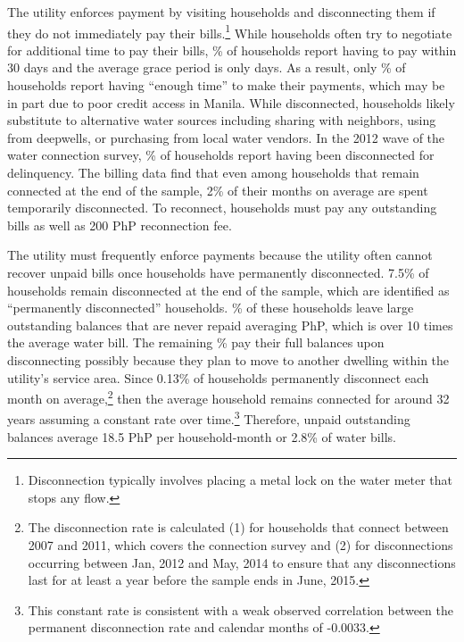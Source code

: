 \documentclass[12pt]{article}
\begin{document}
The utility enforces payment by visiting households and disconnecting them if they do not immediately pay their bills.\footnote{Disconnection typically involves placing a metal lock on the water meter that stops any flow.}  While households often try to negotiate for additional time to pay their bills, \unskip\% of households report having to pay within 30 days and the average grace period is only days.  As a result, only \unskip\% of households report having ``enough time'' to make their payments, which may be in part due to poor credit access in Manila.  While disconnected, households likely substitute to alternative water sources including sharing with neighbors, using from deepwells, or purchasing from local water vendors.  In the 2012 wave of the water connection survey, \unskip\% of households report having been disconnected for delinquency.  The billing data find that even among households that remain connected at the end of the sample, 2\% of their months on average are spent temporarily disconnected.  To reconnect, households must pay any outstanding bills as well as 200 PhP reconnection fee.

The utility must frequently enforce payments because the utility often cannot recover unpaid bills once households have permanently disconnected.  7.5\% of households remain disconnected at the end of the sample, which are identified as ``permanently disconnected'' households.  \unskip\% of these households leave large outstanding balances that are never repaid averaging PhP, which is over 10 times the average water bill.  The remaining \unskip\% pay their full balances upon disconnecting possibly because they plan to move to another dwelling within the utility's service area.  Since 0.13\% of households permanently disconnect each month on average,\footnote{The disconnection rate is calculated (1) for households that connect between 2007 and 2011, which covers the connection survey and (2) for disconnections occurring between Jan, 2012 and May, 2014 to ensure that any disconnections last for at least a year before the sample ends in June, 2015.} then the average household remains connected for around 32 years assuming a constant rate over time.\footnote{This constant rate is consistent with a weak observed correlation between the permanent disconnection rate and calendar months of -0.0033.}  Therefore, unpaid outstanding balances average 18.5 PhP per household-month or 2.8\% of water bills.
\end{document}
